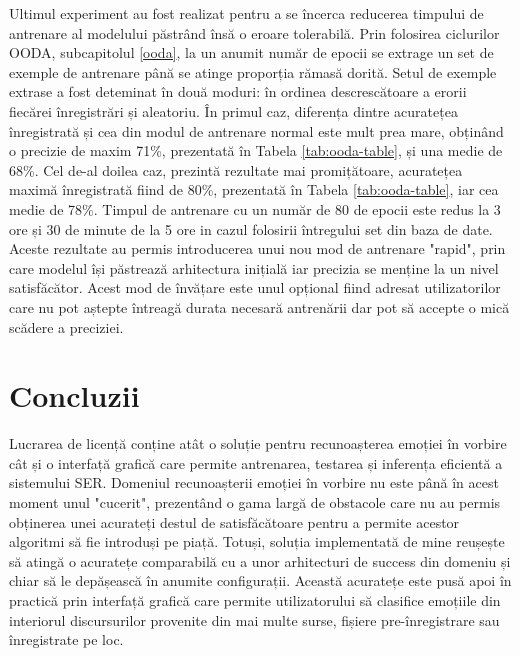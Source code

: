 \documentclass[a4paper,12pt]{book}
\begin{document}
		 Ultimul experiment au fost realizat pentru a se încerca reducerea timpului de antrenare al modelului păstrând însă o eroare tolerabilă. Prin folosirea ciclurilor OODA, subcapitolul \ref{ooda}, la un anumit număr de epocii se extrage un set de exemple de antrenare până se atinge proporția rămasă dorită. Setul de exemple extrase a fost deteminat în două moduri: în ordinea descrescătoare a erorii fiecărei înregistrări și aleatoriu. În primul caz, diferența dintre acuratețea înregistrată și cea din modul de antrenare normal este mult prea mare, obținând o precizie de maxim 71\%, prezentată în Tabela \ref{tab:ooda-table}, și una medie de 68\%. Cel de-al doilea caz, prezintă rezultate mai promițătoare, acuratețea maximă înregistrată fiind de 80\%, prezentată în Tabela \ref{tab:ooda-table}, iar cea medie de 78\%. Timpul de antrenare cu un număr de 80 de epocii este redus la 3 ore și 30 de minute de la 5 ore in cazul folosirii întregului set din baza de date. Aceste rezultate au permis introducerea unui nou mod de antrenare "rapid", prin care modelul își păstrează arhitectura inițială iar precizia se menține la un nivel satisfăcător. Acest mod de învățare este unul opțional fiind adresat utilizatorilor care nu pot aștepte întreagă durata necesară antrenării dar pot să accepte o mică scădere a preciziei. \par
		\chapter{Concluzii}		
		Lucrarea de licență conține atât o soluție pentru recunoașterea emoției în vorbire cât și o interfață grafică care permite antrenarea, testarea și inferența eficientă a sistemului SER. Domeniul recunoașterii emoției în vorbire nu este până în acest moment unul "cucerit", prezentând o gama largă de obstacole care nu au permis obținerea unei acurateți destul de satisfăcătoare pentru a permite acestor algoritmi să fie introduși pe piață. Totuși, soluția implementată de mine reușește să atingă o acuratețe comparabilă cu a unor arhitecturi de success din domeniu și chiar să le depășească în anumite configurații. Această acuratețe este pusă apoi în practică prin interfață grafică care permite utilizatorului să clasifice emoțiile din interiorul discursurilor provenite din mai multe surse, fișiere pre-înregistrare sau înregistrate pe loc. \par		
		
\end{document}
